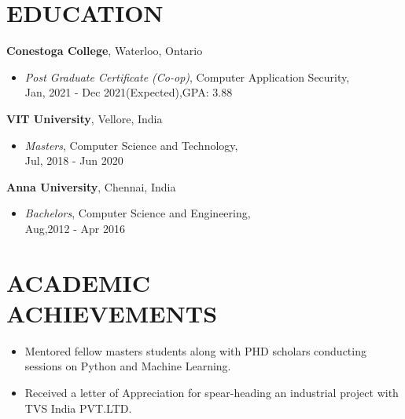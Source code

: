 \documentclass[margin]{res}
\begin{document}
\begin{resume}
\section{EDUCATION}
\textbf{Conestoga College}, Waterloo, Ontario
\begin{itemize}
\item {\sl Post Graduate Certificate (Co-op)}, Computer Application Security, \\Jan, 2021 - Dec 2021(Expected),GPA: 3.88
\end{itemize}
\textbf{VIT University}, Vellore, India
\begin{itemize}
\item {\sl Masters}, Computer Science and Technology, \\Jul, 2018 - Jun 2020\hfill 
\end{itemize}
\textbf{Anna University}, Chennai, India
\begin{itemize}
\item {\sl Bachelors}, Computer Science and Engineering,\\ Aug,2012  - Apr 2016\hfill 
\end{itemize}

\section{ACADEMIC\\ACHIEVEMENTS}
\begin{itemize}
\item Mentored  fellow masters students along with PHD scholars conducting sessions on Python and Machine Learning.
\item Received a letter of Appreciation for spear-heading an industrial project with TVS India PVT.LTD.
\end{itemize}


\end{resume}
\end{document}

